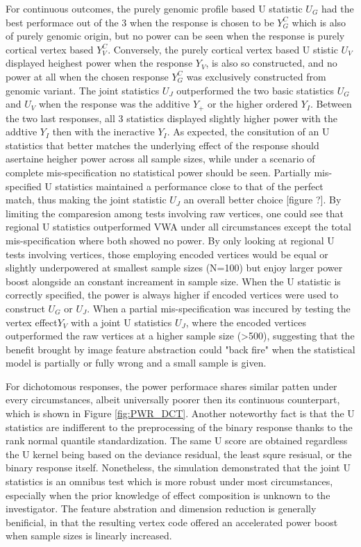 For continuous outcomes, the purely genomic profile based U statistic $U_G$ had the best performace out of the 3 when the response is chosen to be $Y_G^C$ which is also of purely genomic origin, but no power can be seen when the response is purely cortical vertex based $Y_V^C$. Conversely, the purely cortical vertex based U stistic $U_V$ displayed heighest power when the response $Y_V$, is also so constructed, and no power at all when the chosen response $Y_G^C$ was exclusively constructed from genomic variant. The joint statistics $U_J$ outperformed the two basic statistics $U_G$ and $U_V$ when the response was the additive $Y_+$ or the higher ordered $Y_I$. Between the two last responses, all 3 statistics displayed slightly higher power with the addtive $Y_I$ then with the ineractive $Y_I$. As expected, the consitution of an U statistics that better matches the underlying effect of the response should asertaine heigher power across all sample sizes, while under a scenario of complete mis-specification no statistical power should be seen. Partially mis-specified U statistics maintained a performance close to that of the perfect match, thus making the joint statistic $U_J$ an overall better choice [figure ?].
By limiting the comparesion among tests involving raw vertices, one could see that regional U statistics outperformed VWA under all circumstances except the total mis-specification where both showed no power. By only looking at regional U tests involving vertices, those employing encoded vertices would be equal or slightly underpowered at smallest sample sizes (N=100) but enjoy larger power boost alongside an constant increament in sample size. When the U statistic is correctly specified, the power is always higher if encoded vertices were used to construct $U_G$ or $U_J$. When a partial mis-specification was inccured by testing the vertex effect$Y_V$ with a joint U statistics $U_J$, where the encoded vertices outperformed the raw vertices at a higher sample size (>500), suggesting that the benefit brought by image feature abstraction could "back fire" when the statistical model is partially or fully wrong and a small sample is given. 

For dichotomous responses, the power performace shares similar patten under every circumstances, albeit universally poorer then its continuous counterpart, which is shown in Figure \ref{fig:PWR_DCT}. Another noteworthy fact is that the U statistics are indifferent to the preprocessing of the binary response thanks to the rank normal quantile standardization. The same U score are obtained regardless the U kernel being based on the deviance residual, the least squre resisual, or the binary response itself.
Nonetheless, the simulation demonstrated that the joint U statistics is an omnibus test which is more robust under most circumstances, especially when the prior knowledge of effect composition is unknown to the investigator. The feature abstration and dimension reduction is generally benificial, in that the resulting vertex code offered an accelerated power boost when sample sizes is linearly increased.

